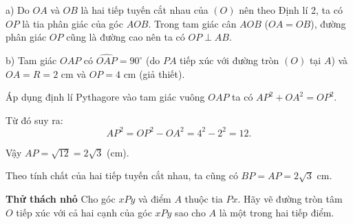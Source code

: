 \begin{lesson}
    a) Do $OA$ và $OB$ là hai tiếp tuyến cắt nhau của $(O)$ nên theo Định lí 2, ta có $OP$ là tia phân giác của góc $AOB$. Trong tam giác cân $AOB$ ($OA=OB$), đường phân giác $OP$ cũng là đường cao nên ta có $OP\perp AB$.

    b) Tam giác $OAP$ có $\widehat{OAP}=90^\circ$ (do $PA$ tiếp xúc với đường tròn $(O)$ tại $A$) và $OA=R=2$ cm và $OP=4$ cm (giả thiết).

    Áp dụng định lí Pythagore vào tam giác vuông $OAP$ ta có $AP^2+OA^2=OP^2$.

    Từ đó suy ra:
    \[
        AP^2=OP^2-OA^2=4^2-2^2=12.
    \]

    Vậy $AP=\sqrt{12}=2\sqrt{3}$ (cm).

    Theo tính chất của hai tiếp tuyến cắt nhau, ta cũng có $BP=AP=2\sqrt{3}$ cm.

    \textbf{Thử thách nhỏ} Cho góc $xPy$ và điểm $A$ thuộc tia $Px$. Hãy vẽ đường tròn tâm $O$ tiếp xúc với cả hai cạnh của góc $xPy$ sao cho $A$ là một trong hai tiếp điểm.

    \answerline
    \answerline
    \answerline
\end{lesson}

